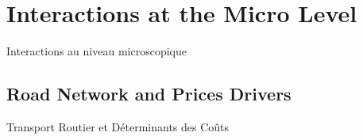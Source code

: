 




\chapter{Interactions at the Micro Level}{Interactions au niveau microscopique} %

\label{ch:micro} %



\headercit{}{}{}


\bigskip






























\section{Road Network and Prices Drivers}{Transport Routier et Déterminants des Coûts}








